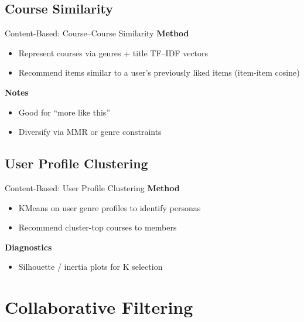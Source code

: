 \documentclass[aspectratio=169]{beamer}
\begin{document}
\subsection{Course Similarity}
\begin{frame}{Content-Based: Course--Course Similarity}
\textbf{Method}
\begin{itemize}
  \item Represent courses via genres + title TF--IDF vectors
  \item Recommend items similar to a user’s previously liked items (item-item cosine)
\end{itemize}

\textbf{Notes}
\begin{itemize}
  \item Good for “more like this”
  \item Diversify via MMR or genre constraints
\end{itemize}

\end{frame}

\subsection{User Profile Clustering}
\begin{frame}{Content-Based: User Profile Clustering}
\textbf{Method}
\begin{itemize}
  \item KMeans on user genre profiles to identify personas
  \item Recommend cluster-top courses to members
\end{itemize}
\textbf{Diagnostics}
\begin{itemize}
  \item Silhouette / inertia plots for K selection
\end{itemize}

\end{frame}

\section{Collaborative Filtering}
\end{document}
